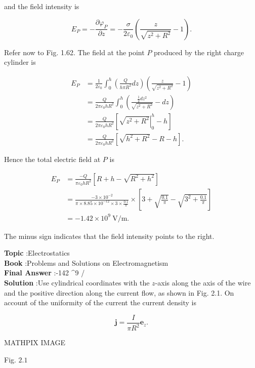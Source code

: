\documentclass[10pt]{article}
\begin{document}
and the field intensity is

$$
E_{P}=-\frac{\partial \varphi_{P}}{\partial z}=-\frac{\sigma}{2 \varepsilon_{0}}\left(\frac{z}{\sqrt{z^{2}+R^{2}}}-1\right) .
$$

Refer now to Fig. 1.62. The field at the point $P$ produced by the right charge cylinder is

$$
\begin{aligned}
E_{P} &=\frac{1}{2 \varepsilon_{0}} \int_{0}^{h}\left(\frac{Q}{h \pi R^{2}} d z\right)\left(\frac{z}{\sqrt{z^{2}+R^{2}}}-1\right) \\
&=\frac{Q}{2 \pi \varepsilon_{0} h R^{2}} \int_{0}^{h}\left(\frac{\frac{1}{2} d z^{2}}{\sqrt{z^{2}+R^{2}}}-d z\right) \\
&=\frac{Q}{2 \pi \varepsilon_{0} h R^{2}}\left[\left.\sqrt{z^{2}+R^{2}}\right|_{0} ^{h}-h\right] \\
&=\frac{Q}{2 \pi \varepsilon_{0} h R^{2}}\left[\sqrt{h^{2}+R^{2}}-R-h\right] .
\end{aligned}
$$

Hence the total electric field at $P$ is

$$
\begin{aligned}
E_{P} &=\frac{-Q}{\pi \varepsilon_{0} h R^{2}}\left[R+h-\sqrt{R^{2}+h^{2}}\right] \\
&=\frac{-3 \times 10^{-2}}{\pi \times 8.85 \times 10^{-12} \times 3 \times \frac{0.1}{\pi}} \times\left[3+\sqrt{\frac{0.1}{\pi}}-\sqrt{3^{2}+\frac{0.1}{\pi}}\right] \\
&=-1.42 \times 10^{9} \mathrm{~V} / \mathrm{m} .
\end{aligned}
$$

The minus sign indicates that the field intensity points to the right.


\textbf{Topic} :Electrostatics\\
\textbf{Book} :Problems and Solutions on Electromagnetism\\
\textbf{Final Answer} :-142 ^{9}  / \\


\textbf{Solution} :Use cylindrical coordinates with the $z$-axis along the axis of the wire and the positive direction along the current flow, as shown in Fig. 2.1. On account of the uniformity of the current the current density is

$$
\mathbf{j}=\frac{I}{\pi R^{2}} \mathbf{e}_{z} .
$$

MATHPIX IMAGE

Fig. $2.1$
\end{document}
